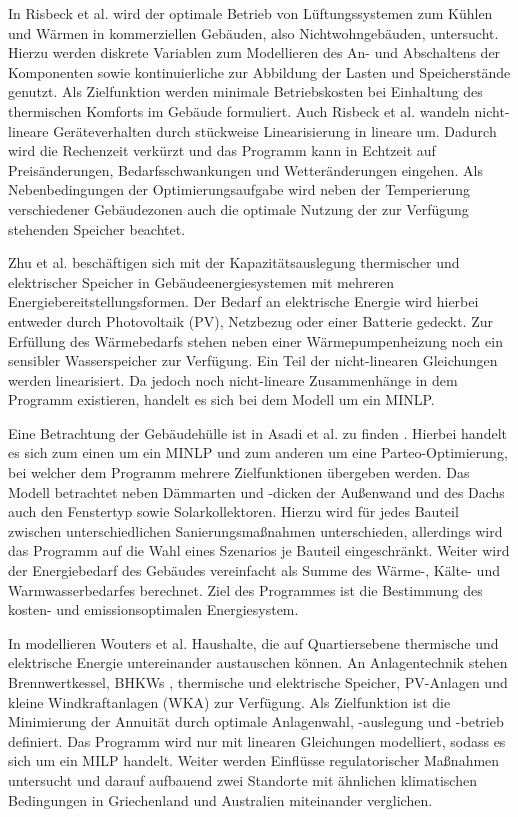 In Risbeck et al. \cite{Risbeck.2017} wird der optimale Betrieb von Lüftungssystemen zum Kühlen und Wärmen in kommerziellen Gebäuden, also Nichtwohngebäuden, untersucht.
Hierzu werden diskrete Variablen zum Modellieren des An- und Abschaltens der Komponenten sowie kontinuierliche zur Abbildung der Lasten und Speicherstände genutzt.
Als Zielfunktion werden minimale Betriebskosten bei Einhaltung des thermischen Komforts im Gebäude formuliert.
Auch Risbeck et al. wandeln nicht-lineare Geräteverhalten durch stückweise Linearisierung in lineare um.
Dadurch wird die Rechenzeit verkürzt und das Programm kann in Echtzeit auf Preisänderungen, Bedarfsschwankungen und Wetteränderungen eingehen.
Als Nebenbedingungen der Optimierungsaufgabe wird neben der Temperierung verschiedener Gebäudezonen auch die optimale Nutzung der zur Verfügung stehenden Speicher beachtet.

Zhu et al. \cite{Zhu.2019} beschäftigen sich mit der Kapazitätsauslegung thermischer und elektrischer Speicher in Gebäudeenergiesystemen mit mehreren Energiebereitstellungsformen. 
Der Bedarf an elektrische Energie wird hierbei entweder durch Photovoltaik (PV), Netzbezug oder einer Batterie gedeckt. 
Zur Erfüllung des Wärmebedarfs stehen neben einer Wärmepumpenheizung noch ein sensibler Wasserspeicher zur Verfügung.
Ein Teil der nicht-linearen Gleichungen werden linearisiert. Da jedoch noch nicht-lineare Zusammenhänge in dem Programm existieren, handelt es sich bei dem Modell um ein MINLP.

Eine Betrachtung der Gebäudehülle ist in Asadi et al. zu finden \cite{Asadi.2012}.
Hierbei handelt es sich zum einen um ein MINLP und zum anderen um eine Parteo-Optimierung, bei welcher dem Programm mehrere Zielfunktionen übergeben werden.
Das Modell betrachtet neben Dämmarten und -dicken der Außenwand und des Dachs auch den Fenstertyp sowie Solarkollektoren. 
Hierzu wird für jedes Bauteil zwischen unterschiedlichen Sanierungsmaßnahmen unterschieden, allerdings wird das Programm auf die Wahl eines Szenarios je Bauteil eingeschränkt.
Weiter wird der Energiebedarf des Gebäudes vereinfacht als Summe des Wärme-, Kälte- und Warmwasserbedarfes berechnet.
Ziel des Programmes ist die Bestimmung des kosten- und emissionsoptimalen Energiesystem.

In \cite{Wouters.2014} modellieren Wouters et al. Haushalte, die auf Quartiersebene thermische und elektrische Energie untereinander austauschen können.
An Anlagentechnik stehen Brennwertkessel, BHKWs , thermische und elektrische Speicher, PV-Anlagen und kleine Windkraftanlagen (WKA) zur Verfügung.
Als Zielfunktion ist die Minimierung der Annuität durch optimale Anlagenwahl, -auslegung und -betrieb definiert.
Das Programm wird nur mit linearen Gleichungen modelliert, sodass es sich um ein MILP handelt.
Weiter werden Einflüsse regulatorischer Maßnahmen untersucht und darauf aufbauend zwei Standorte mit ähnlichen klimatischen Bedingungen in Griechenland und Australien miteinander verglichen.

